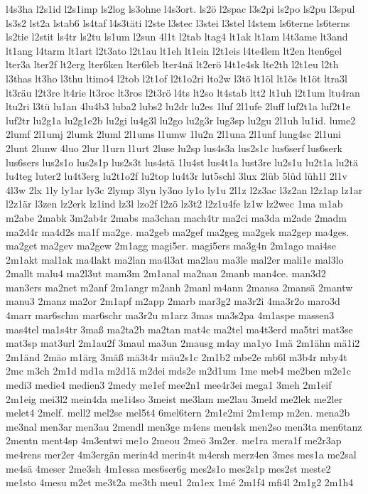 {l4s3ha
l2s1id
l2s1imp
ls2log
ls3ohne
l4s3ort.
ls2ö
l2spac
l3s2pi
ls2po
ls2pu
l3spul
ls3s2
lst2a
lstab6
ls4taf
l4s3täti
l2ste
l3stec
l3stei
l3stel
l4stem
ls6terne
ls6terns
ls2tie
l2stit
ls4tr
ls2tu
ls1um
l2sun
4l1t
l2tab
ltag4
lt1ak
lt1am
l4t3ame
lt3and
lt1ang
l4tarm
lt1art
l2t3ato
l2t1au
lt1eh
lt1ein
l2t1eis
l4te4lem
lt2en
lten6gel
lter3a
lter2f
lt2erg
lter6ken
lter6leb
lter4nä
lt2erö
l4t1e4sk
lte2th
l2t1eu
l2th
l3thas
lt3ho
l3thu
ltimo4
l2tob
l2t1of
l2t1o2ri
lto2w
l3tö
lt1öl
lt1ös
lt1öt
ltra3l
lt3räu
l2t3re
lt4rie
lt3roc
lt3ros
l2t3rö
l4ts
lt2so
lt4stab
ltt2
lt1uh
l2t1um
ltu4ran
ltu2ri
l3tü
lu1an
4lu4b3
luba2
lubs2
lu2dr
lu2es
1luf
2l1ufe
2luff
luf2t1a
luf2t1e
luf2tr
lu2g1a
lu2g1e2b
lu2gi
lu4g3l
lu2go
lu2g3r
lug3sp
lu2gu
2l1uh
lu1id.
lume2
2lumf
2l1umj
2lumk
2luml
2l1ums
l1umw
1lu2n
2l1una
2l1unf
lung4sc
2l1uni
2lunt
2lunw
4luo
2lur
l1urn
l1urt
2luse
lu2sp
lus4s3a
lus2s1c
lus6serf
lus6serk
lus6sers
lus2s1o
lus2s1p
lus2s3t
lus4stä
1lu4st
lus4t1a
lust3re
lu2s1u
lu2t1a
lu2tä
lu4teg
luter2
lu4t3erg
lu2t1o2f
lu2top
lu4t3r
lut5schl
3lux
2lüb
5lüd
lüh1l
2l1v
4l3w
2lx
1ly
ly1ar
ly3c
2lymp
3lyn
ly3no
ly1o
ly1u
2l1z
l2z3ac
l3z2an
l2z1ap
lz1ar
l2z1är
l3zen
lz2erk
lz1ind
lz3l
lzo2f
l2zö
lz3t2
l2z1u4fe
lz1w
lz2wec
1ma
m1ab
m2abe
2mabk
3m2ab4r
2mabs
ma3chan
mach4tr
ma2ci
ma3da
m2ade
2madm
ma2d4r
ma4d2s
ma1f
ma2ge.
ma2geb
ma2gef
ma2geg
ma2gek
ma2gep
ma4ges.
ma2get
ma2gev
ma2gew
2m1agg
magi5er.
magi5ers
ma3g4n
2m1ago
mai4se
2m1akt
mal1ak
ma4lakt
ma2lan
ma4l3at
ma2lau
ma3le
mal2er
mali1e
mal3lo
2mallt
malu4
ma2l3ut
mam3m
2m1anal
ma2nau
2manb
man4ce.
man3d2
man3ers
ma2net
m2anf
2m1angr
m2anh
2manl
m4ann
2mansa
2mansä
2mantw
manu3
2manz
ma2or
2m1apf
m2app
2marb
mar3g2
ma3r2i
4ma3r2o
maro3d
4marr
mar6schm
mar6schr
ma3r2u
m1arz
3mas
ma3s2pa
4m1aspe
massen3
mas4tel
ma1s4tr
3maß
ma2ta2b
ma2tan
mat4c
ma2tel
ma4t3erd
ma5tri
mat3se
mat3sp
mat3url
2m1au2f
3maul
ma3un
2mausg
m4ay
ma1yo
1mä
2m1ähn
mä1i2
2m1änd
2mäo
m1ärg
3mäß
mä3t4r
mäu2s1c
2m1b2
mbe2e
mb6l
m3b4r
mby4t
2mc
m3ch
2m1d
md1a
m2d1ä
m2dei
mds2e
m2d1um
1me
meb4
me2ben
m2e1c
medi3
medie4
medien3
2medy
me1ef
mee2n1
mee4r3ei
mega1
3meh
2m1eif
2m1eig
mei3l2
mein4da
me1i4so
3meist
me3lam
me2lau
3meld
me2lek
me2ler
melet4
2melf.
mell2
mel2se
mel5t4
6mel6tern
2m1e2mi
2m1emp
m2en.
mena2b
me3nal
men3ar
men3au
2mendl
men3ge
m4ens
men4sk
men2so
men3ta
men6tanz
2mentn
ment4sp
4m3entwi
me1o
2meou
2meö
3m2er.
me1ra
mera1f
me2r3ap
me4rens
mer2er
4m3ergän
merin4d
merin4t
m4ersh
merz4en
3mes
mes1a
me2sal
me4sä
4meser
2me3sh
4m1essa
mes6ser6g
mes2s1o
mes2s1p
mes2st
meste2
me1sto
4mesu
m2et
me3t2a
me3th
meu1
2m1ex
1mé
2m1f4
mfi4l
2m1g2
2m1h4
}
